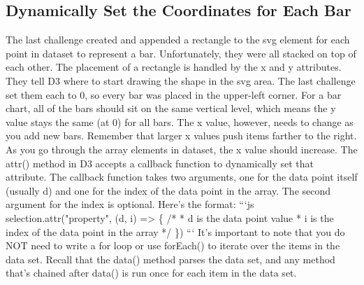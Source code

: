 \documentclass{article}%
\begin{document}
%
\subsection{Dynamically Set the Coordinates for Each Bar}%
\label{subsec:DynamicallySettheCoordinatesforEachBar}%
The last challenge created and appended a rectangle to the svg element for each point in dataset to represent a bar. Unfortunately, they were all stacked on top of each other.\newline%
The placement of a rectangle is handled by the x and y attributes. They tell D3 where to start drawing the shape in the svg area. The last challenge set them each to 0, so every bar was placed in the upper{-}left corner.\newline%
For a bar chart, all of the bars should sit on the same vertical level, which means the y value stays the same (at 0) for all bars. The x value, however, needs to change as you add new bars. Remember that larger x values push items farther to the right. As you go through the array elements in dataset, the x value should increase.\newline%
The attr() method in D3 accepts a callback function to dynamically set that attribute. The callback function takes two arguments, one for the data point itself (usually d) and one for the index of the data point in the array. The second argument for the index is optional. Here's the format:\newline%
```js\newline%
selection.attr("property", (d, i) => \{\newline%
  /* \newline%
  * d is the data point value\newline%
  * i is the index of the data point in the array\newline%
  */\newline%
\})\newline%
```\newline%
It's important to note that you do NOT need to write a for loop or use forEach() to iterate over the items in the data set. Recall that the data() method parses the data set, and any method that's chained after data() is run once for each item in the data set.\newline%

%
\end{document}

